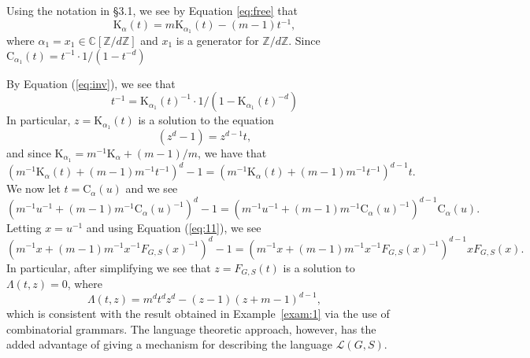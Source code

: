 \documentclass[11pt]{amsart}
\newtheorem{theorem}{Theorem}[section]
\theoremstyle{definition}
\newcommand{\gen}[1]{\langle #1 \rangle}
\newcommand{\Z}{\mathbb{Z}}
\newcommand{\inv}[1]{#1^{-1}}
\newcommand{\CT}{\mathrm{C}}
\newcommand{\invCT}{\mathrm{K}}
\newcommand{\brot}{\mathfrak{r}}%
\newcommand{\flip}{\mathfrak{f}} %
\begin{document}
Using the notation in \S3.1, we see by Equation \ref{eq:free} that
$$\invCT_{\alpha}(t) = m \invCT_{\alpha_1}(t) - (m-1)t^{-1},$$ where $\alpha_1=x_1 \in \mathbb{C}[\mathbb{Z}/d\mathbb{Z}]$ and $x_1$ is a generator for $\mathbb{Z}/d\mathbb{Z}$.  
Since $\CT_{\alpha_1}(t) = \inv{t}\cdot 1/(1-t^{-d})$

By Equation (\ref{eq:inv}), we see that
$$t^{-1}  = \invCT_{\alpha_1}(t)^{-1} \cdot 1/(1-\invCT_{\alpha_1}(t)^{-d})$$
In particular, 
$z=\invCT_{\alpha_1}(t)$ is a solution to the equation
$$(z^d-1)  = z^{d-1}t,$$ and since $\invCT_{\alpha_1}=m^{-1} \invCT_{\alpha} + (m-1)/m$, we have
that 
$$(m^{-1} \invCT_{\alpha}(t)+(m-1)m^{-1}t^{-1})^d - 1 = (m^{-1} \invCT_{\alpha}(t)+(m-1)m^{-1}t^{-1})^{d-1}t.$$
We now let $t=\CT_{\alpha}(u)$ and we see
$$(m^{-1} u^{-1} + (m-1)m^{-1}\CT_{\alpha}(u)^{-1})^d -1 = (m^{-1} u^{-1} + (m-1)m^{-1}\CT_{\alpha}(u)^{-1})^{d-1} \CT_{\alpha}(u).$$
Letting $x=u^{-1}$ and using Equation (\ref{eq:11}), we see
$$(m^{-1} x + (m-1)m^{-1}x^{-1} F_{G,S}(x)^{-1})^d - 1 = (m^{-1} x + (m-1) m^{-1} x^{-1} F_{G,S}(x)^{-1})^{d-1} x F_{G,S}(x).$$
 In particular, after simplifying we see that $z=F_{G,S}(t)$ is a solution to $\Lambda(t,z)=0$, where 
 $$\Lambda(t,z) = m^d t^d z^d - (z-1)(z+m-1)^{d-1},$$
which is consistent with the result obtained in Example~\ref{exam:1} via the use of combinatorial grammars.  The language theoretic approach, however, has the added advantage of giving a mechanism for describing the language $\mathcal{L}(G,S)$.  


\end{document}
